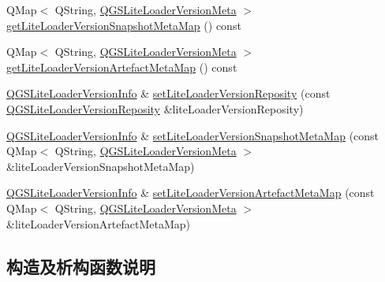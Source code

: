 \begin{DoxyCompactItemize}
\item 
Q\+Map$<$ Q\+String, \mbox{\hyperlink{class_q_g_s_lite_loader_version_meta}{Q\+G\+S\+Lite\+Loader\+Version\+Meta}} $>$ \mbox{\hyperlink{class_q_g_s_lite_loader_version_info_af4bd384dba3ccd5e894da4249ccdbbcc}{get\+Lite\+Loader\+Version\+Snapshot\+Meta\+Map}} () const
\item 
Q\+Map$<$ Q\+String, \mbox{\hyperlink{class_q_g_s_lite_loader_version_meta}{Q\+G\+S\+Lite\+Loader\+Version\+Meta}} $>$ \mbox{\hyperlink{class_q_g_s_lite_loader_version_info_a0e3dcb4945cc19b2e26a0d2df555444b}{get\+Lite\+Loader\+Version\+Artefact\+Meta\+Map}} () const
\item 
\mbox{\hyperlink{class_q_g_s_lite_loader_version_info}{Q\+G\+S\+Lite\+Loader\+Version\+Info}} \& \mbox{\hyperlink{class_q_g_s_lite_loader_version_info_a9ca55492c4767fe4b4cd9e802692b81a}{set\+Lite\+Loader\+Version\+Reposity}} (const \mbox{\hyperlink{class_q_g_s_lite_loader_version_reposity}{Q\+G\+S\+Lite\+Loader\+Version\+Reposity}} \&lite\+Loader\+Version\+Reposity)
\item 
\mbox{\hyperlink{class_q_g_s_lite_loader_version_info}{Q\+G\+S\+Lite\+Loader\+Version\+Info}} \& \mbox{\hyperlink{class_q_g_s_lite_loader_version_info_a0bc7df758f0a72055ca5d9af8042a057}{set\+Lite\+Loader\+Version\+Snapshot\+Meta\+Map}} (const Q\+Map$<$ Q\+String, \mbox{\hyperlink{class_q_g_s_lite_loader_version_meta}{Q\+G\+S\+Lite\+Loader\+Version\+Meta}} $>$ \&lite\+Loader\+Version\+Snapshot\+Meta\+Map)
\item 
\mbox{\hyperlink{class_q_g_s_lite_loader_version_info}{Q\+G\+S\+Lite\+Loader\+Version\+Info}} \& \mbox{\hyperlink{class_q_g_s_lite_loader_version_info_a80c3f62697c4db40c72752364a069fa9}{set\+Lite\+Loader\+Version\+Artefact\+Meta\+Map}} (const Q\+Map$<$ Q\+String, \mbox{\hyperlink{class_q_g_s_lite_loader_version_meta}{Q\+G\+S\+Lite\+Loader\+Version\+Meta}} $>$ \&lite\+Loader\+Version\+Artefact\+Meta\+Map)
\end{DoxyCompactItemize}


\subsection{构造及析构函数说明}
\mbox{\label{class_q_g_s_lite_loader_version_info_a93dcda6c14cfbd4b78ad5055af3beeec}} 
